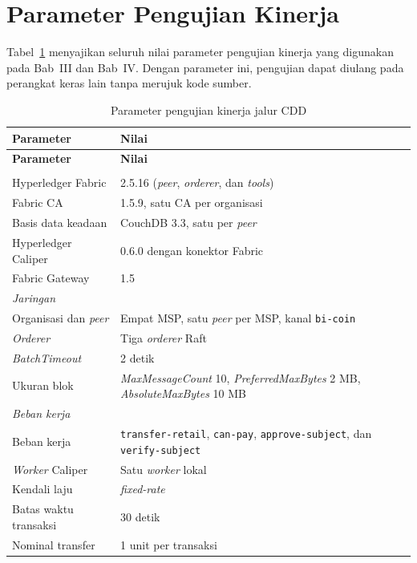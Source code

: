 \section{Parameter Pengujian Kinerja}

Tabel~\ref{tab:lamp-parameter-kinerja} menyajikan seluruh nilai parameter pengujian kinerja yang digunakan pada Bab~III dan Bab~IV. Dengan parameter ini, pengujian dapat diulang pada perangkat keras lain tanpa merujuk kode sumber.

\begingroup
\renewcommand{\arraystretch}{1.2}
\begin{longtable}{p{5.2cm} p{8.8cm}}
\caption{Parameter pengujian kinerja jalur CDD}
\label{tab:lamp-parameter-kinerja} \\
\toprule
\textbf{Parameter} & \textbf{Nilai} \\
\midrule
\endfirsthead
\toprule
\textbf{Parameter} & \textbf{Nilai} \\
\midrule
\endhead
\bottomrule
\endfoot
\multicolumn{2}{l}{\textit{Perangkat lunak}} \\
Hyperledger Fabric & 2.5.16 (\textit{peer}, \textit{orderer}, dan \textit{tools}) \\
Fabric CA & 1.5.9, satu CA per organisasi \\
Basis data keadaan & CouchDB 3.3, satu per \textit{peer} \\
Hyperledger Caliper & 0.6.0 dengan konektor Fabric \\
Fabric Gateway & 1.5 \\
\midrule
\multicolumn{2}{l}{\textit{Jaringan}} \\
Organisasi dan \textit{peer} & Empat MSP, satu \textit{peer} per MSP, kanal \texttt{bi-coin} \\
\textit{Orderer} & Tiga \textit{orderer} Raft \\
\textit{BatchTimeout} & 2 detik \\
Ukuran blok & \textit{MaxMessageCount} 10, \textit{PreferredMaxBytes} 2 MB, \textit{AbsoluteMaxBytes} 10 MB \\
\midrule
\multicolumn{2}{l}{\textit{Beban kerja}} \\
Beban kerja & \texttt{transfer-retail}, \texttt{can-pay}, \texttt{approve-subject}, dan \texttt{verify-subject} \\
\textit{Worker} Caliper & Satu \textit{worker} lokal \\
Kendali laju & \textit{fixed-rate} \\
Batas waktu transaksi & 30 detik \\
Nominal transfer & 1 unit per transaksi \\

\end{longtable}
